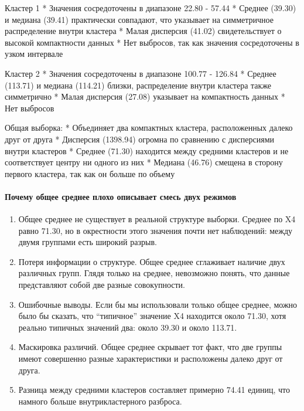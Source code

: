 \documentclass[11pt]{article}
\begin{document}
Кластер 1 * Значения сосредоточены в диапазоне 22.80 - 57.44 * Среднее
(39.30) и медиана (39.41) практически совпадают, что указывает на
симметричное распределение внутри кластера * Малая дисперсия (41.02)
свидетельствует о высокой компактности данных * Нет выбросов, так как
значения сосредоточены в узком интервале

Кластер 2 * Значения сосредоточены в диапазоне 100.77 - 126.84 * Среднее
(113.71) и медиана (114.21) близки, распределение внутри кластера также
симметрично * Малая дисперсия (27.08) указывает на компактность данных *
Нет выбросов

Общая выборка: * Объединяет два компактных кластера, расположенных
далеко друг от друга * Дисперсия (1398.94) огромна по сравнению с
дисперсиями внутри кластеров * Среднее (71.30) находится между средними
кластеров и не соответствует центру ни одного из них * Медиана (46.76)
смещена в сторону первого кластера, так как он больше по объему

    \paragraph{Почему общее среднее плохо описывает смесь двух
режимов}\label{ux43fux43eux447ux435ux43cux443-ux43eux431ux449ux435ux435-ux441ux440ux435ux434ux43dux435ux435-ux43fux43bux43eux445ux43e-ux43eux43fux438ux441ux44bux432ux430ux435ux442-ux441ux43cux435ux441ux44c-ux434ux432ux443ux445-ux440ux435ux436ux438ux43cux43eux432}

\begin{enumerate}
\def\labelenumi{\arabic{enumi}.}
\item
  Общее среднее не существует в реальной структуре выборки. Среднее по
  X4 равно 71.30, но в окрестности этого значения почти нет наблюдений:
  между двумя группами есть широкий разрыв.
\item
  Потеря информации о структуре. Общее среднее сглаживает наличие двух
  различных групп. Глядя только на среднее, невозможно понять, что
  данные представляют собой две разные совокупности.
\item
  Ошибочные выводы. Если бы мы использовали только общее среднее, можно
  было бы сказать, что ``типичное'' значение X4 находится около 71.30,
  хотя реально типичных значений два: около 39.30 и около 113.71.
\item
  Маскировка различий. Общее среднее скрывает тот факт, что две группы
  имеют совершенно разные характеристики и расположены далеко друг от
  друга.
\item
  Разница между средними кластеров составляет примерно 74.41 единиц, что
  намного больше внутрикластерного разброса.
\end{enumerate}


    
    
    
\end{document}
